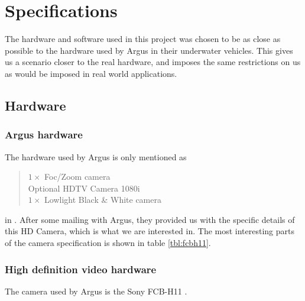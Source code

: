 
\chapter{Specifications}
The hardware and software used in this project was chosen to be as close as possible to the 
hardware used by Argus in their underwater vehicles. This gives us 
a scenario closer to the real hardware, and imposes the same 
restrictions on us as would be imposed in real world applications.

\section{Hardware}

\subsection{Argus hardware}\label{sec:argus_hw}
The hardware used by Argus is only mentioned as 
\begin{quote}
$1\times$ Foc/Zoom camera \\
Optional HDTV Camera 1080i \\
$1\times$ Lowlight Black \& White camera \\
\end{quote}
in \citet{argusROV}. After some mailing with Argus, they provided us 
with the specific details of this HD Camera, which is what we are interested in. 
The most interesting parts of the camera specification is shown in table \vref{tbl:fcbh11}.

\subsection{High definition video hardware}\label{sec:fcb_h11_hw}
The camera used by Argus is the Sony FCB-H11 \citet{fcbh11}. 

